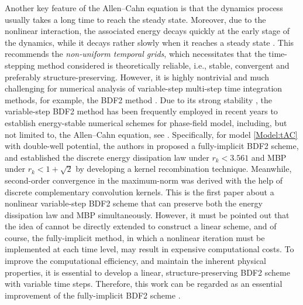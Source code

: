\documentclass{m2an}
\begin{document}
Another key feature of the Allen--Cahn equation is that the dynamics process usually takes a long time to reach the steady state. Moreover, due to the nonlinear interaction, the associated energy decays quickly at the early stage of the dynamics, while it decays rather slowly when it reaches a steady state \cite{MOC_2023_Ju,SINUM_2020_Liao}. This recommends the %
\textit{non-uniform temporal grids}, which necessitates that the time-stepping method considered is theoretically reliable, i.e., stable, convergent and preferably structure-preserving. 
However, it is highly nontrivial and much challenging for numerical analysis of variable-step multi-step time integration methods, for example, the BDF2 method \cite{BIT_1998_Becker,ESAIM_2024_Fu}. Due to its strong stability \cite{SINUM_1974_Gear,MOC_2021_Liao,SISC_1997_Shampine}, the variable-step BDF2 method has been frequently employed in recent years to establish energy-stable numerical schemes for phase-field model, including, but not limited to, the Allen--Cahn equation, see 
\cite{SINUM_2020_Liao,SINUM_2019_Chen,IMA_2022_Liao,JSC_2023_Chen}. Specifically, for model \eqref{Model:tAC} with double-well potential, the authors in 
\cite{SINUM_2020_Liao} proposed a fully-implicit BDF2 scheme, and established the discrete energy dissipation law under $ r_{k} < 3.561 $ and MBP under $ r_{k} < 1 + \sqrt{2} $ by developing a kernel recombination technique. Meanwhile, second-order convergence in the maximum-norm was derived with the help of discrete complementary convolution kernels. This is the first paper about a nonlinear variable-step BDF2 scheme that can preserve both the energy dissipation law and MBP simultaneously. However, it must be pointed out that the idea of \cite{SINUM_2020_Liao} cannot be directly extended to construct a linear scheme, and of course, the fully-implicit method, in which a nonlinear iteration must be implemented at each time level, may result in expensive computational costs. To improve the computational efficiency, and maintain the inherent physical properties, it is essential to develop a linear, structure-preserving BDF2 scheme with variable time steps. Therefore, this work can be regarded as an essential improvement of the fully-implicit BDF2 scheme \cite{SINUM_2020_Liao}. 
\end{document}
